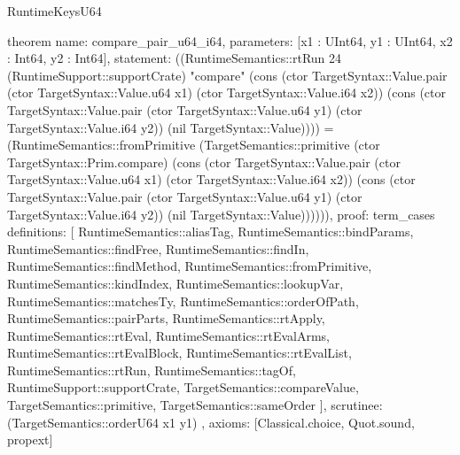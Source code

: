\begin{lexlean}{RuntimeKeysU64}
\begin{semanticmodule}
theorem{
  name: compare_pair_u64_i64,
  parameters: [x1 : UInt64, y1 : UInt64, x2 : Int64, y2 : Int64],
  statement: ((RuntimeSemantics::rtRun 24 (RuntimeSupport::supportCrate) "compare" (cons (ctor TargetSyntax::Value.pair (ctor TargetSyntax::Value.u64 x1) (ctor TargetSyntax::Value.i64 x2)) (cons (ctor TargetSyntax::Value.pair (ctor TargetSyntax::Value.u64 y1) (ctor TargetSyntax::Value.i64 y2)) (nil TargetSyntax::Value)))) = (RuntimeSemantics::fromPrimitive (TargetSemantics::primitive (ctor TargetSyntax::Prim.compare) (cons (ctor TargetSyntax::Value.pair (ctor TargetSyntax::Value.u64 x1) (ctor TargetSyntax::Value.i64 x2)) (cons (ctor TargetSyntax::Value.pair (ctor TargetSyntax::Value.u64 y1) (ctor TargetSyntax::Value.i64 y2)) (nil TargetSyntax::Value)))))),
  proof: term_cases{
    definitions: [
      RuntimeSemantics::aliasTag,
      RuntimeSemantics::bindParams,
      RuntimeSemantics::findFree,
      RuntimeSemantics::findIn,
      RuntimeSemantics::findMethod,
      RuntimeSemantics::fromPrimitive,
      RuntimeSemantics::kindIndex,
      RuntimeSemantics::lookupVar,
      RuntimeSemantics::matchesTy,
      RuntimeSemantics::orderOfPath,
      RuntimeSemantics::pairParts,
      RuntimeSemantics::rtApply,
      RuntimeSemantics::rtEval,
      RuntimeSemantics::rtEvalArms,
      RuntimeSemantics::rtEvalBlock,
      RuntimeSemantics::rtEvalList,
      RuntimeSemantics::rtRun,
      RuntimeSemantics::tagOf,
      RuntimeSupport::supportCrate,
      TargetSemantics::compareValue,
      TargetSemantics::primitive,
      TargetSemantics::sameOrder
    ],
    scrutinee: (TargetSemantics::orderU64 x1 y1)
  },
  axioms: [Classical.choice, Quot.sound, propext]
}
\end{semanticmodule}
\end{lexlean}
